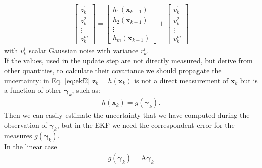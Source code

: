 \begin{align}
{\begin{bmatrix}
z_k^1 \\[10pt]
z_k^2 \\[10pt]
\vdots \\[10pt]
z_k^m
\end{bmatrix}}=
{\begin{bmatrix}
 h_1(\boldsymbol{x}_{k-1}) \\[10pt]
h_2(\boldsymbol{x}_{k-1})  \\[10pt]
\vdots \\[10pt]
h_m(\boldsymbol{x}_{k-1}) 
\end{bmatrix}} 
+ 
{\begin{bmatrix}
v_k^1 \\[10pt]
v_k^2 \\[10pt]
\vdots \\[10pt]
v_k^m
\end{bmatrix}}
\end{align}
with $v_k^i$ scalar Gaussian noise with variance $r_k^i$.\\
If the values, used in the update step are not directly measured, but derive from other quantities, to calculate their covariance we should propagate the uncertainty: in Eq. \eqref{eq:ekf2} $\boldsymbol{z}_k = h(\boldsymbol{x}_{k})$ is not a direct measurement of $\boldsymbol{x}_{k}$ but is a function of other  $\boldsymbol{\gamma}_k$, such as:
\begin{align}
h(\boldsymbol{x}_{k}) = g(\boldsymbol{\gamma}_k).
\end{align}
Then we can easily estimate the uncertainty that we have computed during the observation of  $\boldsymbol{\gamma}_k$, but in the EKF we need the correspondent error for the measures $ g(\boldsymbol{\gamma}_k)$.\\

In the linear case 
\begin{align}
g(\boldsymbol{\gamma}_k) = \mathrm {A}\boldsymbol{\gamma}_k
\end{align}

